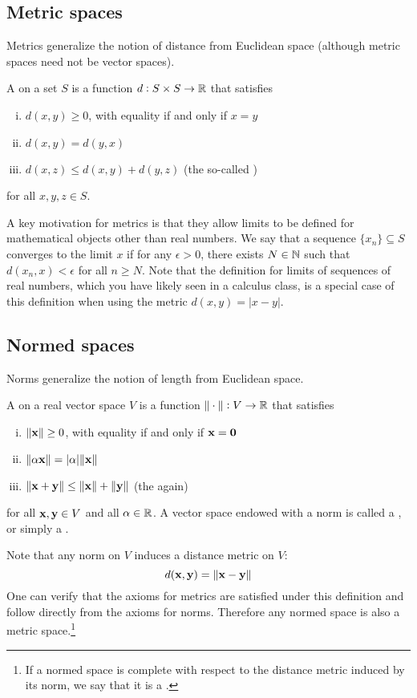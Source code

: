 \subsection{Metric spaces}
Metrics generalize the notion of distance from Euclidean space (although metric spaces need not be vector spaces).

A  on a set $S$ is a function $d : S \times S \to \mathbb{R}$ that satisfies
\begin{enumerate}[(i)]
\item $d(x,y) \geq 0$, with equality if and only if $x = y$
\item $d(x,y) = d(y,x)$
\item $d(x,z) \leq d(x,y) + d(y,z)$ (the so-called )
\end{enumerate}
for all $x, y, z \in S$.

A key motivation for metrics is that they allow limits to be defined for mathematical objects other than real numbers.
We say that a sequence $\{x_n\} \subseteq S$ converges to the limit $x$ if for any $\epsilon > 0$, there exists $N \in \mathbb{N}$ such that $d(x_n, x) < \epsilon$ for all $n \geq N$.
Note that the definition for limits of sequences of real numbers, which you have likely seen in a calculus class, is a special case of this definition when using the metric $d(x, y) = |x-y|$.

\subsection{Normed spaces}
Norms generalize the notion of length from Euclidean space.

A  on a real vector space $V$ is a function $\|\cdot\| : V \to \mathbb{R}$ that satisfies
\begin{enumerate}[(i)]
\item $\|\mathbf{x}\| \geq 0$, with equality if and only if $\mathbf{x} = \mathbf{0}$
\item $\|\alpha\mathbf{x}\| = |\alpha|\|\mathbf{x}\|$
\item $\|\mathbf{x}+\mathbf{y}\| \leq \|\mathbf{x}\| + \|\mathbf{y}\|$ (the  again)
\end{enumerate}
for all $\mathbf{x}, \mathbf{y} \in V$ and all $\alpha \in \mathbb{R}$.
A vector space endowed with a norm is called a , or simply a .

Note that any norm on $V$ induces a distance metric on $V$:
\[d(\mathbf{x}, \mathbf{y}) = \|\mathbf{x}-\mathbf{y}\|\]
One can verify that the axioms for metrics are satisfied under this definition and follow directly from the axioms for norms.
Therefore any normed space is also a metric space.\footnote{
    If a normed space is complete with respect to the distance metric induced by its norm, we say that it is a .
}

